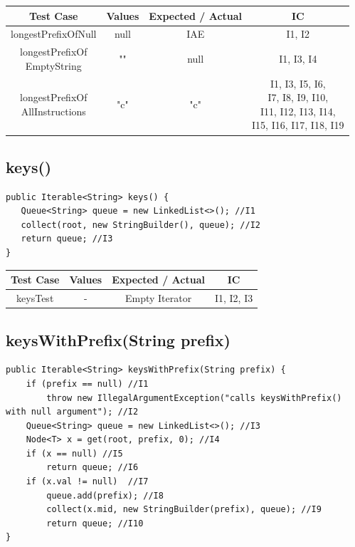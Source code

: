 \documentclass[12pt]{article}
\begin{document}
\begin{table}[htb]
\centering
\begin{tabular}{| c | c | c | c |} 
 \hline
 Test Case & Values & Expected / Actual & IC\\ \hline
 longestPrefixOfNull & null & IAE & I1, I2 \\ \hline
 \makecell{longestPrefixOf\\EmptyString} & "" & null & I1, I3, I4 \\ \hline
 \makecell{longestPrefixOf\\AllInstructions} & "c" & "c" & \makecell{I1, I3, I5, I6,\\ I7, I8, I9, I10, \\ I11, I12, I13, I14, \\ I15, I16, I17, I18, I19} \\ \hline
\end{tabular}
\end{table}


\subsection{keys()}
\begin{lstlisting}
public Iterable<String> keys() {
   Queue<String> queue = new LinkedList<>(); //I1
   collect(root, new StringBuilder(), queue); //I2
   return queue; //I3
}
\end{lstlisting}

\begin{table}[htb]
\centering
\begin{tabular}{| c | c | c | c |} 
 \hline
 Test Case & Values & Expected / Actual & IC\\ \hline
 keysTest & - & Empty Iterator & I1, I2, I3 \\ \hline
\end{tabular}
\end{table}


\subsection{keysWithPrefix(String prefix)}
\begin{lstlisting}
public Iterable<String> keysWithPrefix(String prefix) {
    if (prefix == null) //I1
        throw new IllegalArgumentException("calls keysWithPrefix() with null argument"); //I2
    Queue<String> queue = new LinkedList<>(); //I3
    Node<T> x = get(root, prefix, 0); //I4
    if (x == null) //I5
        return queue; //I6
    if (x.val != null)  //I7
        queue.add(prefix); //I8
        collect(x.mid, new StringBuilder(prefix), queue); //I9
        return queue; //I10
}
\end{lstlisting}
\end{document}
